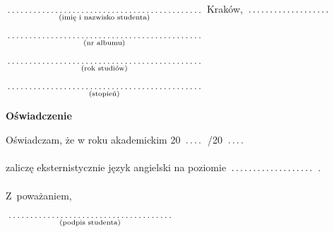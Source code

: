 \documentclass[a4paper,8pt]{article}
\newcommand{\fillField}[2]{
    $\underset{\text{#1}}{\parbox[t]{#2}{\dotfill}}$
}
\begin{document}
\noindent
\fillField{(imię i nazwisko studenta)}{7cm} \hfill Kraków, \fillField{}{3cm}\\\\
\fillField{(nr albumu)}{7cm} \\\\
\fillField{(rok studiów)}{7cm} \\\\
\fillField{(stopień)}{7cm} \\


\vskip 2.0cm

\begin{center}
{\Large \textbf{Oświadczenie}}
\end{center}

\vskip 0.5cm

\noindent
Oświadczam, że w roku akademickim 20\fillField{}{0.7cm}/20\fillField{}{0.7cm}
zaliczę eksternistycznie język angielski na poziomie \fillField{}{3cm}.

\vskip 2.0cm

\hspace{\fill} Z~poważaniem, \hspace{2.8cm} \\\\
\null\hfill\fillField{(podpis studenta)}{6cm}%
\vskip 4.0cm
\end{document}
